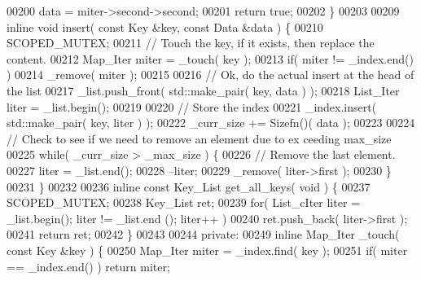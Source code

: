 \begin{DoxyCode}
00200                         data = miter->second->second;
00201                         \textcolor{keywordflow}{return} \textcolor{keyword}{true};
00202                 \}
00203 
00209                 \textcolor{keyword}{inline} \textcolor{keywordtype}{void} insert( \textcolor{keyword}{const} Key &key, \textcolor{keyword}{const} Data &data ) \{
00210                         SCOPED\_MUTEX;
00211                         \textcolor{comment}{// Touch the key, if it exists, then replace the content.
      }
00212                         Map_Iter miter = \_touch( key );
00213                         \textcolor{keywordflow}{if}( miter != \_index.end() )
00214                                 \_remove( miter );
00215 
00216                         \textcolor{comment}{// Ok, do the actual insert at the head of the list}
00217                         \_list.push\_front( std::make\_pair( key, data ) );
00218                         List_Iter liter = \_list.begin();
00219 
00220                         \textcolor{comment}{// Store the index}
00221                         \_index.insert( std::make\_pair( key, liter ) );
00222                         \_curr\_size += Sizefn()( data );
00223 
00224                         \textcolor{comment}{// Check to see if we need to remove an element due to ex
      ceeding max\_size}
00225                         \textcolor{keywordflow}{while}( \_curr\_size > \_max\_size ) \{
00226                                 \textcolor{comment}{// Remove the last element.}
00227                                 liter = \_list.end();
00228                                 --liter;
00229                                 \_remove( liter->first );
00230                         \}
00231                 \}
00232 
00236                 \textcolor{keyword}{inline} \textcolor{keyword}{const} Key_List get_all_keys( \textcolor{keywordtype}{void} ) \{
00237                         SCOPED\_MUTEX;
00238                         Key_List ret;
00239                         \textcolor{keywordflow}{for}( List_cIter liter = \_list.begin(); liter != \_list.end
      (); liter++ )
00240                                 ret.push\_back( liter->first );
00241                         \textcolor{keywordflow}{return} ret;
00242                 \}
00243 
00244         \textcolor{keyword}{private}:
00249                 \textcolor{keyword}{inline} Map_Iter \_touch( \textcolor{keyword}{const} Key &key ) \{
00250                         Map_Iter miter = \_index.find( key );
00251                         \textcolor{keywordflow}{if}( miter == \_index.end() ) \textcolor{keywordflow}{return} miter;

\end{DoxyCode}
